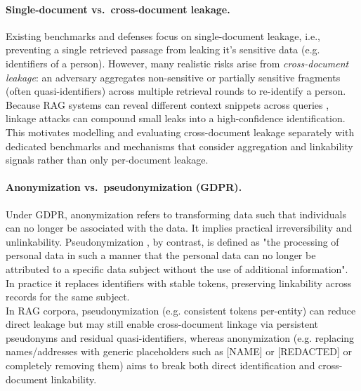 \paragraph{Single-document vs.\ cross-document leakage.}
Existing benchmarks and defenses focus on single-document leakage, i.e., preventing a single retrieved passage from leaking it's sensitive data (e.g. identifiers of a person).\cite{ragSAGE}\cite{goodAndBad}  However, many realistic risks arise from \textit{cross-document leakage}: an  adversary aggregates non-sensitive or partially sensitive fragments (often quasi-identifiers) across multiple retrieval rounds to re-identify a person. \\
Because RAG systems can reveal different context snippets across queries \cite{ragThief}, linkage attacks can compound small leaks into a high-confidence identification.
This motivates modelling and evaluating cross-document leakage separately with dedicated benchmarks and mechanisms that consider aggregation and linkability signals rather than only per-document leakage.


\paragraph{Anonymization vs.\ pseudonymization (GDPR).}
Under GDPR, anonymization refers to transforming data such that individuals can no longer be associated with the data. It implies practical irreversibility and unlinkability. Pseudonymization , by contrast, is defined as "the processing of personal data in such a manner that the personal data can no longer be attributed to a specific data subject without the use of additional information".\cite{anonDefinition} In practice it replaces identifiers with stable tokens, preserving linkability across records for the same subject.\\
In \ac{RAG} corpora, pseudonymization (e.g. consistent tokens per-entity) can reduce direct leakage but may still enable cross-document linkage via persistent pseudonyms and residual quasi-identifiers, whereas anonymization (e.g. replacing names/addresses with generic placeholders such as [NAME] or [REDACTED] or completely removing them) aims to break both direct identification and cross-document linkability.





